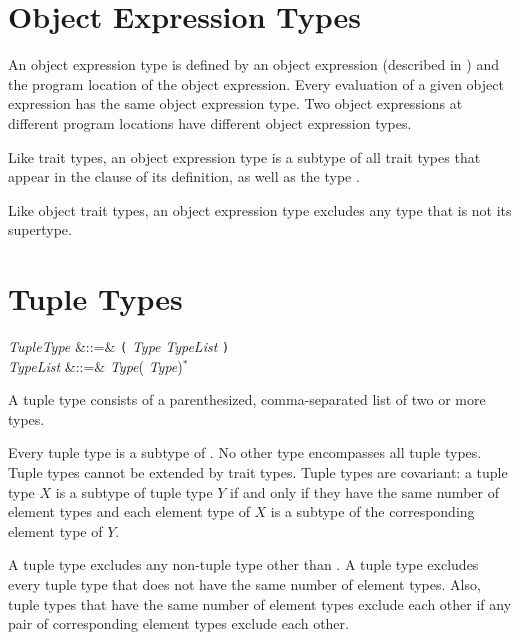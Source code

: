 \section{Object Expression Types}

An object expression type is defined by an object expression
(described in )
and the program location of the object expression.
Every evaluation of a given object expression has the same
object expression type.  Two object expressions at different program locations
have different object expression types.

Like trait types,
an object expression type is a subtype of all trait types
that appear in the  clause of its definition,
as well as the type .

Like object trait types,
an object expression type excludes any type that is not its supertype.


\section{Tuple Types}

\begin{Grammar}
\emph{TupleType} &::=&
\texttt{(} \emph{Type}\EXP{,} \emph{TypeList} \texttt{)}\\

\emph{TypeList} &::=& \emph{Type}(\EXP{,} \emph{Type})$^*$
\end{Grammar}

A tuple type consists of a parenthesized, comma-separated list
of two or more types.

Every tuple type is a subtype of .
No other type encompasses all tuple types.
Tuple types cannot be extended by trait types.
Tuple types are covariant:
a tuple type $X$ is a subtype of tuple type $Y$
if and only if they have the same number of element types
and each element type of $X$ is a subtype of the
corresponding element type of $Y$.

A tuple type excludes any non-tuple type
other than .
A tuple type excludes every tuple type that does not have the same
number of element types.
Also, tuple types that have the same number of element types exclude each other
if any pair of corresponding element types exclude each other.

